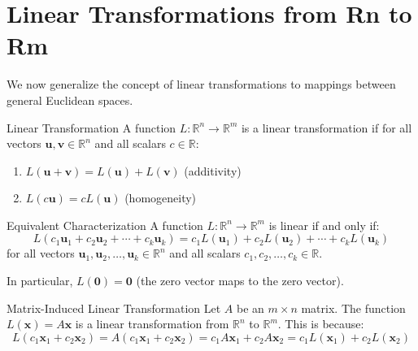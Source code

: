 \documentclass[12pt,a4paper]{article}
\newcommand{\R}{\mathbb{R}}
\newcommand{\vv}[1]{\mathbf{#1}}
\newcommand{\vzero}{\mathbf{0}}
\begin{document}
	\section{Linear Transformations from Rn to Rm}
	
	We now generalize the concept of linear transformations to mappings between general Euclidean spaces.
	
	\begin{definition}{Linear Transformation}
		A function $L: \R^n \to \R^m$ is a linear transformation if for all vectors $\vv{u}, \vv{v} \in \R^n$ and all scalars $c \in \R$:
		\begin{enumerate}[label=(\roman*)]
			\item $L(\vv{u} + \vv{v}) = L(\vv{u}) + L(\vv{v})$ \quad (additivity)
			\item $L(c\vv{u}) = cL(\vv{u})$ \quad (homogeneity)
		\end{enumerate}
	\end{definition}
	
	\begin{remark}{Equivalent Characterization}
		A function $L: \R^n \to \R^m$ is linear if and only if:
		\[
		L(c_1\vv{u}_1 + c_2\vv{u}_2 + \cdots + c_k\vv{u}_k) = c_1L(\vv{u}_1) + c_2L(\vv{u}_2) + \cdots + c_kL(\vv{u}_k)
		\]
		for all vectors $\vv{u}_1, \vv{u}_2, \ldots, \vv{u}_k \in \R^n$ and all scalars $c_1, c_2, \ldots, c_k \in \R$. 
		
		In particular, $L(\vzero) = \vzero$ (the zero vector maps to the zero vector).
	\end{remark}
	
	\begin{example}{Matrix-Induced Linear Transformation}
		Let $A$ be an $m \times n$ matrix. The function $L(\vv{x}) = A\vv{x}$ is a linear transformation from $\R^n$ to $\R^m$. This is because:
		\[
		L(c_1\vv{x}_1 + c_2\vv{x}_2) = A(c_1\vv{x}_1 + c_2\vv{x}_2) = c_1A\vv{x}_1 + c_2A\vv{x}_2 = c_1L(\vv{x}_1) + c_2L(\vv{x}_2)
		\]
	\end{example}
	
\end{document}
